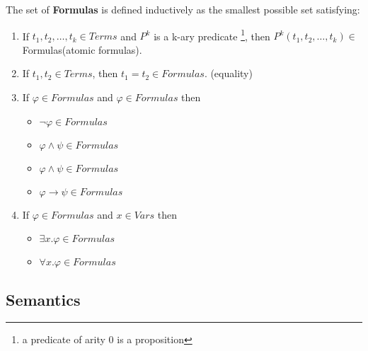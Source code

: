 \begin{defs}
	The set of \textbf{Formulas} is defined inductively as the smallest possible set satisfying:
	\begin{enumerate}
		\item If $t_{1},t_{2},\ldots,t_{k} \in Terms$ and $P^{k}$ is a k-ary predicate \footnote{a predicate of arity 0 is a proposition}, then $P^{k}(t_{1},t_{2},\ldots,t_{k}) \in$ Formulas(atomic formulas).
		\item If $t_{1},t_{2} \in Terms$, then $t_{1} = t_{2} \in Formulas$. (equality)
		\item If $\varphi \in Formulas$ and $\varphi \in Formulas$ then
		\begin{itemize}
			\item $\neg\varphi \in Formulas$
			\item $\varphi \wedge \psi \in Formulas $
			\item $\varphi \wedge \psi \in Formulas $
			\item $\varphi \rightarrow \psi \in Formulas$
		\end{itemize}
		\item If $\varphi \in Formulas$ and $x \in Vars$ then
		\begin{itemize}
			\item $\exists x.\varphi \in Formulas$
			\item $\forall x.\varphi \in Formulas$
		\end{itemize} 
	\end{enumerate}	 
\end{defs}

\subsection*{Semantics}
